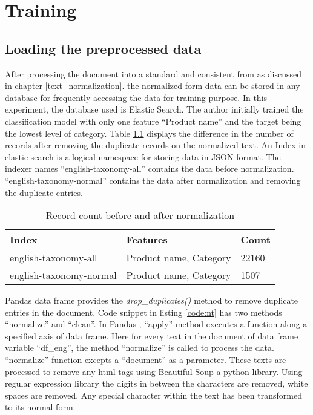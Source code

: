 \chapter{Training}

\section{Loading the preprocessed data}

After processing the document into a standard and consistent from as discussed in chapter \ref{text_normalization}. the normalized form data can be stored in any database for frequently accessing the data for training purpose. In this experiment, the database used is Elastic Search. The author initially trained the classification model with only one feature ``Product name'' and the target being the lowest level of category.
Table \ref{table:AfterNormal} displays the difference in the number of records after removing the duplicate records on the normalized text. An Index in elastic search is a logical namespace for storing data in JSON format. The indexer names ``english-taxonomy-all'' contains the data before normalization. ``english-taxonomy-normal'' contains the data after normalization and removing the duplicate entries.

\begin{table}[h]
    \centering
    \caption{Record count before and after normalization}
    \label{table:AfterNormal}
    \begin{tabular}{ lll }
          \toprule
          
          \textbf{Index}& \textbf{Features} & \textbf{Count}\\
          \midrule
          english-taxonomy-all&Product name, Category & 22160\\
          english-taxonomy-normal&Product name, Category & 1507\\
          
          \bottomrule
          \end{tabular}
\end{table}

Pandas data frame \parencite{mckinney-proc-scipy-2010} provides the \textit{drop\_duplicates()} method to remove duplicate entries in the document. Code snippet in listing \ref{code:nt} has two methods ``normalize'' and ``clean''. In Pandas \parencite{mckinney-proc-scipy-2010}, ``apply'' method executes a function along a specified axis of data frame. Here for every text in the document of data frame variable ``df\_eng'', the method ``normalize'' is called to process the data. ``normalize'' function excepts a ``document'' as a parameter.  These texts are processed to remove any html tags using Beautiful Soup a python library. Using regular expression library the digits in between the characters are removed, white spaces are removed. Any special character within the text has been transformed to its normal form.

